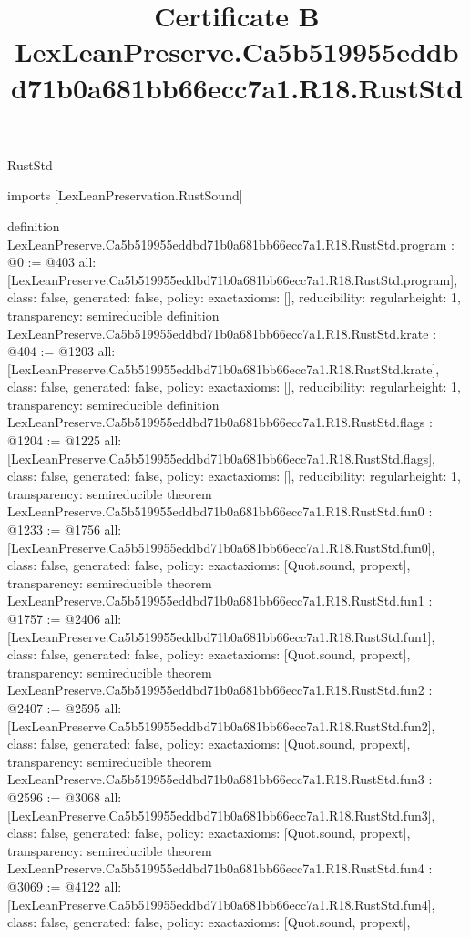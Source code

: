 \begin{lexlean}{RustStd}
\title{Certificate B LexLeanPreserve.Ca5b519955eddbd71b0a681bb66ecc7a1.R18.RustStd}
\begin{coremodule}
imports [LexLeanPreservation.RustSound]

definition LexLeanPreserve.Ca5b519955eddbd71b0a681bb66ecc7a1.R18.RustStd.program : @0 := @403 {
  all: [LexLeanPreserve.Ca5b519955eddbd71b0a681bb66ecc7a1.R18.RustStd.program],
  class: false,
  generated: false,
  policy: exact{axioms: []},
  reducibility: regular{height: 1},
  transparency: semireducible
}
definition LexLeanPreserve.Ca5b519955eddbd71b0a681bb66ecc7a1.R18.RustStd.krate : @404 := @1203 {
  all: [LexLeanPreserve.Ca5b519955eddbd71b0a681bb66ecc7a1.R18.RustStd.krate],
  class: false,
  generated: false,
  policy: exact{axioms: []},
  reducibility: regular{height: 1},
  transparency: semireducible
}
definition LexLeanPreserve.Ca5b519955eddbd71b0a681bb66ecc7a1.R18.RustStd.flags : @1204 := @1225 {
  all: [LexLeanPreserve.Ca5b519955eddbd71b0a681bb66ecc7a1.R18.RustStd.flags],
  class: false,
  generated: false,
  policy: exact{axioms: []},
  reducibility: regular{height: 1},
  transparency: semireducible
}
theorem LexLeanPreserve.Ca5b519955eddbd71b0a681bb66ecc7a1.R18.RustStd.fun0 : @1233 := @1756 {
  all: [LexLeanPreserve.Ca5b519955eddbd71b0a681bb66ecc7a1.R18.RustStd.fun0],
  class: false,
  generated: false,
  policy: exact{axioms: [Quot.sound, propext]},
  transparency: semireducible
}
theorem LexLeanPreserve.Ca5b519955eddbd71b0a681bb66ecc7a1.R18.RustStd.fun1 : @1757 := @2406 {
  all: [LexLeanPreserve.Ca5b519955eddbd71b0a681bb66ecc7a1.R18.RustStd.fun1],
  class: false,
  generated: false,
  policy: exact{axioms: [Quot.sound, propext]},
  transparency: semireducible
}
theorem LexLeanPreserve.Ca5b519955eddbd71b0a681bb66ecc7a1.R18.RustStd.fun2 : @2407 := @2595 {
  all: [LexLeanPreserve.Ca5b519955eddbd71b0a681bb66ecc7a1.R18.RustStd.fun2],
  class: false,
  generated: false,
  policy: exact{axioms: [Quot.sound, propext]},
  transparency: semireducible
}
theorem LexLeanPreserve.Ca5b519955eddbd71b0a681bb66ecc7a1.R18.RustStd.fun3 : @2596 := @3068 {
  all: [LexLeanPreserve.Ca5b519955eddbd71b0a681bb66ecc7a1.R18.RustStd.fun3],
  class: false,
  generated: false,
  policy: exact{axioms: [Quot.sound, propext]},
  transparency: semireducible
}
theorem LexLeanPreserve.Ca5b519955eddbd71b0a681bb66ecc7a1.R18.RustStd.fun4 : @3069 := @4122 {
  all: [LexLeanPreserve.Ca5b519955eddbd71b0a681bb66ecc7a1.R18.RustStd.fun4],
  class: false,
  generated: false,
  policy: exact{axioms: [Quot.sound, propext]},
}
\end{coremodule}
\end{lexlean}
